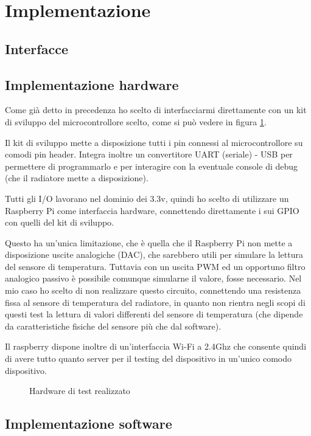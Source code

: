 \documentclass[a4paper,titlepage]{article}
\begin{document}
\section{Implementazione}

\subsection{Interfacce}

\subsection{Implementazione hardware}

Come già detto in precedenza ho scelto di interfacciarmi direttamente con un kit
di sviluppo del microcontrollore scelto, come si può vedere in figura \ref{quadretto}.

Il kit di sviluppo mette a disposizione tutti i pin connessi al microcontrollore
su comodi pin header. Integra inoltre un convertitore UART (seriale) - USB per
permettere di programmarlo e per interagire con la eventuale console di debug
(che il radiatore mette a disposizione).

Tutti gli I/O lavorano nel dominio dei 3.3v, quindi ho scelto di utilizzare un
Raspberry Pi come interfaccia hardware, connettendo direttamente i sui GPIO con
quelli del kit di sviluppo.

Questo ha un'unica limitazione, che è quella che il Raspberry Pi non mette a disposizione
uscite analogiche (DAC), che sarebbero utili per simulare la lettura del sensore di
temperatura. Tuttavia con un uscita PWM ed un opportuno filtro analogico passivo è
possibile comunque simularne il valore, fosse necessario. Nel mio caso ho scelto di
non realizzare questo circuito, connettendo una resistenza fissa al sensore di
temperatura del radiatore, in quanto non rientra negli scopi di questi test la lettura
di valori differenti del sensore di temperatura (che dipende da caratteristiche fisiche
del sensore più che dal software).

Il raspberry dispone inoltre di un'interfaccia Wi-Fi a 2.4Ghz che consente quindi di
avere tutto quanto server per il testing del dispositivo in un'unico comodo dispositivo.

\begin{figure}
    \caption{Hardware di test realizzato}
    \label{quadretto}
\end{figure}

\subsection{Implementazione software}
\end{document}
